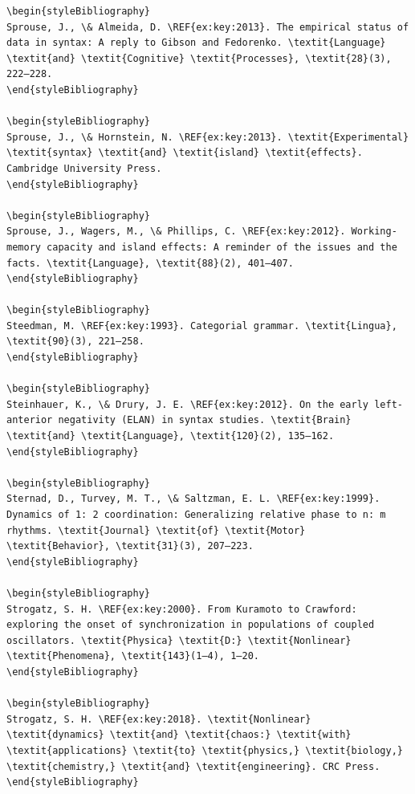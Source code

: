 \begin{verbatim}
\begin{styleBibliography}
Sprouse, J., \& Almeida, D. \REF{ex:key:2013}. The empirical status of data in syntax: A reply to Gibson and Fedorenko. \textit{Language} \textit{and} \textit{Cognitive} \textit{Processes}, \textit{28}(3), 222–228.
\end{styleBibliography}

\begin{styleBibliography}
Sprouse, J., \& Hornstein, N. \REF{ex:key:2013}. \textit{Experimental} \textit{syntax} \textit{and} \textit{island} \textit{effects}. Cambridge University Press.
\end{styleBibliography}

\begin{styleBibliography}
Sprouse, J., Wagers, M., \& Phillips, C. \REF{ex:key:2012}. Working-memory capacity and island effects: A reminder of the issues and the facts. \textit{Language}, \textit{88}(2), 401–407.
\end{styleBibliography}

\begin{styleBibliography}
Steedman, M. \REF{ex:key:1993}. Categorial grammar. \textit{Lingua}, \textit{90}(3), 221–258.
\end{styleBibliography}

\begin{styleBibliography}
Steinhauer, K., \& Drury, J. E. \REF{ex:key:2012}. On the early left-anterior negativity (ELAN) in syntax studies. \textit{Brain} \textit{and} \textit{Language}, \textit{120}(2), 135–162.
\end{styleBibliography}

\begin{styleBibliography}
Sternad, D., Turvey, M. T., \& Saltzman, E. L. \REF{ex:key:1999}. Dynamics of 1: 2 coordination: Generalizing relative phase to n: m rhythms. \textit{Journal} \textit{of} \textit{Motor} \textit{Behavior}, \textit{31}(3), 207–223.
\end{styleBibliography}

\begin{styleBibliography}
Strogatz, S. H. \REF{ex:key:2000}. From Kuramoto to Crawford: exploring the onset of synchronization in populations of coupled oscillators. \textit{Physica} \textit{D:} \textit{Nonlinear} \textit{Phenomena}, \textit{143}(1–4), 1–20.
\end{styleBibliography}

\begin{styleBibliography}
Strogatz, S. H. \REF{ex:key:2018}. \textit{Nonlinear} \textit{dynamics} \textit{and} \textit{chaos:} \textit{with} \textit{applications} \textit{to} \textit{physics,} \textit{biology,} \textit{chemistry,} \textit{and} \textit{engineering}. CRC Press.
\end{styleBibliography}


\end{verbatim}
